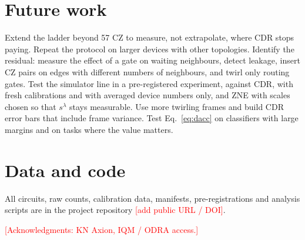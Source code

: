 \documentclass[aps,pra,twocolumn,superscriptaddress,nofootinbib,10pt]{revtex4-2}
\newcommand{\VERIFY}[1]{\textcolor{red}{[#1]}}
\begin{document}
\section{Future work}

Extend the ladder beyond 57 CZ to measure, not extrapolate, where CDR stops paying. Repeat the
protocol on larger devices with other topologies. Identify the residual: measure the effect of a gate
on waiting neighbours, detect leakage, insert CZ pairs on edges with different numbers of neighbours,
and twirl only routing gates. Test the simulator line in a pre-registered experiment, against CDR,
with fresh calibrations and with averaged device numbers only, and ZNE with scales chosen so that $s^\lambda$ stays measurable.
Use more twirling frames and build CDR error bars that include frame variance. Test
Eq.~\eqref{eq:dacc} on classifiers with large margins and on tasks where the value matters.

\section*{Data and code}
All circuits, raw counts, calibration data, manifests, pre-registrations and analysis scripts are
in the project repository \VERIFY{add public URL / DOI}.

\begin{acknowledgments}
\VERIFY{Acknowledgments: KN Axion, IQM / ODRA access.}
\end{acknowledgments}


\end{document}
